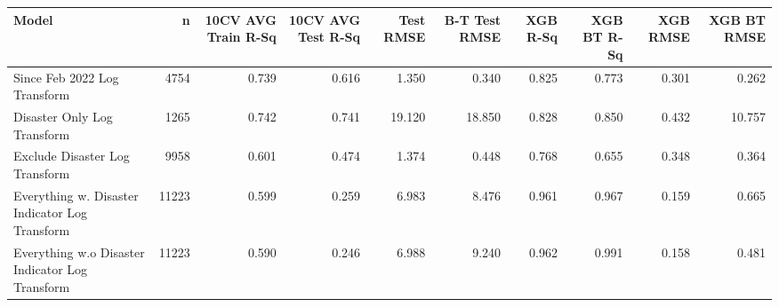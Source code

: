 
\begin{tabular}{l|r|r|r|r|r|r|r|r|r}
\hline
Model & n & 10CV AVG Train R-Sq & 10CV AVG Test R-Sq & Test RMSE & B-T Test RMSE & XGB R-Sq & XGB BT R-Sq & XGB RMSE & XGB BT RMSE\\
\hline
Since Feb 2022 Log Transform & 4754 & 0.739 & 0.616 & 1.350 & 0.340 & 0.825 & 0.773 & 0.301 & 0.262\\
\hline
Disaster Only Log Transform & 1265 & 0.742 & 0.741 & 19.120 & 18.850 & 0.828 & 0.850 & 0.432 & 10.757\\
\hline
Exclude Disaster Log Transform & 9958 & 0.601 & 0.474 & 1.374 & 0.448 & 0.768 & 0.655 & 0.348 & 0.364\\
\hline
Everything w. Disaster Indicator Log Transform & 11223 & 0.599 & 0.259 & 6.983 & 8.476 & 0.961 & 0.967 & 0.159 & 0.665\\
\hline
Everything w.o Disaster Indicator Log Transform & 11223 & 0.590 & 0.246 & 6.988 & 9.240 & 0.962 & 0.991 & 0.158 & 0.481\\
\hline
\end{tabular}
